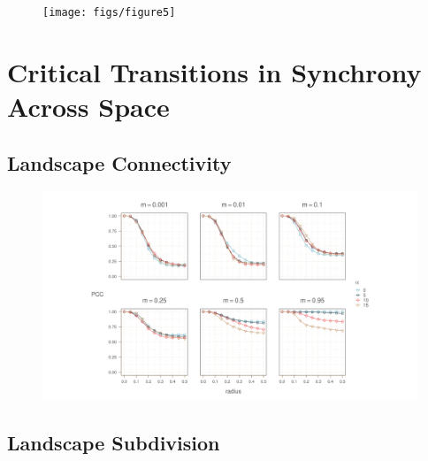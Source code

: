 \documentclass[]{article}
\begin{document}
\begin{figure}[h]
    \texttt{[image: figs/figure5]}
    \caption{}
    \label{}
\end{figure}


\hypertarget{critical-transitions-across-space}{%
\section{Critical Transitions in Synchrony Across Space}\label{critical-transitions-across-space}}

\hypertarget{simulating-a-phase-transition-across-a-migration-gradient}{%
\subsection{Landscape Connectivity}\label{simulating-a-phase-transition-across-a-migration-gradient}}



\begin{figure}
    \includegraphics[width=15cm]{figs/figure9}
    \caption{}
    \label{}
\end{figure}

\hypertarget{simulating-a-phase-transition-across-a-migration-gradient}{%
\subsection{Landscape Subdivision}\label{simulating-a-phase-transition-across-a-migration-gradient}}
\end{document}
